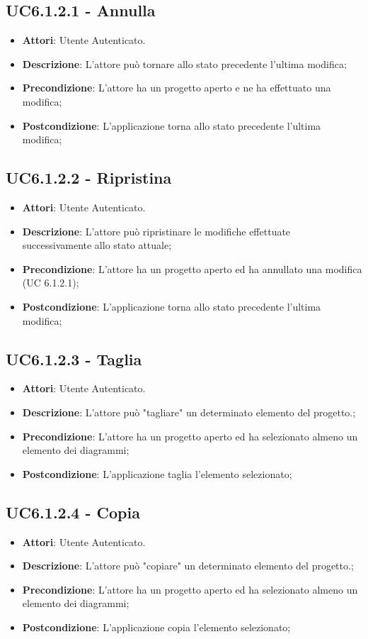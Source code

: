 \subsection{UC6.1.2.1 - Annulla} 
\label{ssec:UC6.1.2.1} 
\begin{itemize} 
\item \textbf{Attori}: Utente Autenticato.
\item \textbf{Descrizione}: L’attore può tornare allo stato precedente l’ultima modifica;
\item \textbf{Precondizione}: L'attore ha un progetto aperto e ne ha effettuato una modifica;
\item \textbf{Postcondizione}: L’applicazione torna allo stato precedente l’ultima modifica;
\end{itemize} 
\subsection{UC6.1.2.2 - Ripristina} 
\label{ssec:UC6.1.2.2} 
\begin{itemize} 
\item \textbf{Attori}: Utente Autenticato.
\item \textbf{Descrizione}: L’attore può ripristinare le modifiche effettuate successivamente allo stato attuale;
\item \textbf{Precondizione}: L’attore ha un progetto aperto ed ha annullato una modifica (UC 6.1.2.1);
\item \textbf{Postcondizione}: L’applicazione torna allo stato precedente l’ultima modifica;
\end{itemize} 
\subsection{UC6.1.2.3 - Taglia} 
\label{ssec:UC6.1.2.3} 
\begin{itemize} 
\item \textbf{Attori}: Utente Autenticato.
\item \textbf{Descrizione}: L’attore può "tagliare" un determinato elemento del progetto.;
\item \textbf{Precondizione}: L’attore ha un progetto aperto ed ha selezionato almeno un elemento dei diagrammi;
\item \textbf{Postcondizione}: L’applicazione taglia l’elemento selezionato;
\end{itemize} 
\subsection{UC6.1.2.4 - Copia} 
\label{ssec:UC6.1.2.4} 
\begin{itemize} 
\item \textbf{Attori}: Utente Autenticato.
\item \textbf{Descrizione}: L’attore può "copiare" un determinato elemento del progetto.;
\item \textbf{Precondizione}: L’attore ha un progetto aperto ed ha selezionato almeno un elemento dei diagrammi;
\item \textbf{Postcondizione}: L’applicazione copia l’elemento selezionato;
\end{itemize} 
